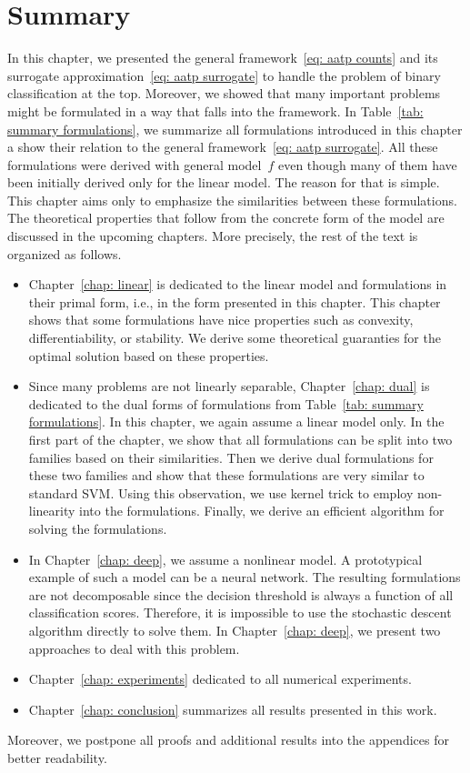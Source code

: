 \section{Summary}

In this chapter, we presented the general framework~\eqref{eq: aatp counts} and its surrogate approximation~\eqref{eq: aatp surrogate} to handle the problem of binary classification at the top. Moreover, we showed that many important problems might be formulated in a way that falls into the framework. In Table~\ref{tab: summary formulations}, we summarize all formulations introduced in this chapter a show their relation to the general framework~\eqref{eq: aatp surrogate}. All these formulations were derived with general model~$f$ even though many of them have been initially derived only for the linear model. The reason for that is simple. This chapter aims only to emphasize the similarities between these formulations. The theoretical properties that follow from the concrete form of the model are discussed in the upcoming chapters. More precisely, the rest of the text is organized as follows.
\begin{itemize}
  \item Chapter~\ref{chap: linear} is dedicated to the linear model and formulations in their primal form, i.e., in the form presented in this chapter. This chapter shows that some formulations have nice properties such as convexity, differentiability, or stability. We derive some theoretical guaranties for the optimal solution based on these properties.
  \item Since many problems are not linearly separable, Chapter~\ref{chap: dual} is dedicated to the dual forms of formulations from Table~\ref{tab: summary formulations}.
  In this chapter, we again assume a linear model only. In the first part of the chapter, we show that all formulations can be split into two families based on their similarities. Then we derive dual formulations for these two families and show that these formulations are very similar to standard SVM. Using this observation, we use kernel trick to employ non-linearity into the formulations. Finally, we derive an efficient algorithm for solving the formulations.
  \item In Chapter~\ref{chap: deep}, we assume a nonlinear model. A prototypical example of such a model can be a neural network. The resulting formulations are not decomposable since the decision threshold is always a function of all classification scores. Therefore, it is impossible to use the stochastic descent algorithm directly to solve them. In Chapter~\ref{chap: deep}, we present two approaches to deal with this problem.
  \item Chapter~\ref{chap: experiments} dedicated to all numerical experiments.
  \item Chapter~\ref{chap: conclusion}  summarizes all results presented in this work. 
\end{itemize}
Moreover, we postpone all proofs and additional results into the appendices for better readability.


